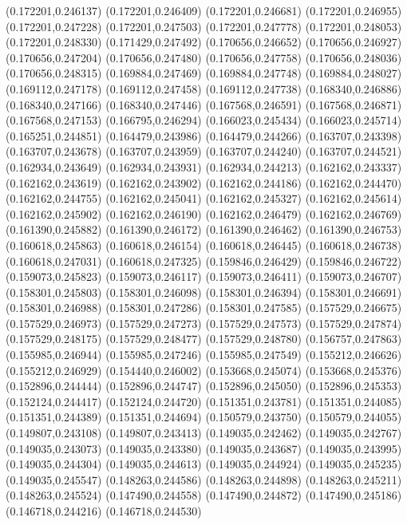 (0.172201,0.246137)
(0.172201,0.246409)
(0.172201,0.246681)
(0.172201,0.246955)
(0.172201,0.247228)
(0.172201,0.247503)
(0.172201,0.247778)
(0.172201,0.248053)
(0.172201,0.248330)
(0.171429,0.247492)
(0.170656,0.246652)
(0.170656,0.246927)
(0.170656,0.247204)
(0.170656,0.247480)
(0.170656,0.247758)
(0.170656,0.248036)
(0.170656,0.248315)
(0.169884,0.247469)
(0.169884,0.247748)
(0.169884,0.248027)
(0.169112,0.247178)
(0.169112,0.247458)
(0.169112,0.247738)
(0.168340,0.246886)
(0.168340,0.247166)
(0.168340,0.247446)
(0.167568,0.246591)
(0.167568,0.246871)
(0.167568,0.247153)
(0.166795,0.246294)
(0.166023,0.245434)
(0.166023,0.245714)
(0.165251,0.244851)
(0.164479,0.243986)
(0.164479,0.244266)
(0.163707,0.243398)
(0.163707,0.243678)
(0.163707,0.243959)
(0.163707,0.244240)
(0.163707,0.244521)
(0.162934,0.243649)
(0.162934,0.243931)
(0.162934,0.244213)
(0.162162,0.243337)
(0.162162,0.243619)
(0.162162,0.243902)
(0.162162,0.244186)
(0.162162,0.244470)
(0.162162,0.244755)
(0.162162,0.245041)
(0.162162,0.245327)
(0.162162,0.245614)
(0.162162,0.245902)
(0.162162,0.246190)
(0.162162,0.246479)
(0.162162,0.246769)
(0.161390,0.245882)
(0.161390,0.246172)
(0.161390,0.246462)
(0.161390,0.246753)
(0.160618,0.245863)
(0.160618,0.246154)
(0.160618,0.246445)
(0.160618,0.246738)
(0.160618,0.247031)
(0.160618,0.247325)
(0.159846,0.246429)
(0.159846,0.246722)
(0.159073,0.245823)
(0.159073,0.246117)
(0.159073,0.246411)
(0.159073,0.246707)
(0.158301,0.245803)
(0.158301,0.246098)
(0.158301,0.246394)
(0.158301,0.246691)
(0.158301,0.246988)
(0.158301,0.247286)
(0.158301,0.247585)
(0.157529,0.246675)
(0.157529,0.246973)
(0.157529,0.247273)
(0.157529,0.247573)
(0.157529,0.247874)
(0.157529,0.248175)
(0.157529,0.248477)
(0.157529,0.248780)
(0.156757,0.247863)
(0.155985,0.246944)
(0.155985,0.247246)
(0.155985,0.247549)
(0.155212,0.246626)
(0.155212,0.246929)
(0.154440,0.246002)
(0.153668,0.245074)
(0.153668,0.245376)
(0.152896,0.244444)
(0.152896,0.244747)
(0.152896,0.245050)
(0.152896,0.245353)
(0.152124,0.244417)
(0.152124,0.244720)
(0.151351,0.243781)
(0.151351,0.244085)
(0.151351,0.244389)
(0.151351,0.244694)
(0.150579,0.243750)
(0.150579,0.244055)
(0.149807,0.243108)
(0.149807,0.243413)
(0.149035,0.242462)
(0.149035,0.242767)
(0.149035,0.243073)
(0.149035,0.243380)
(0.149035,0.243687)
(0.149035,0.243995)
(0.149035,0.244304)
(0.149035,0.244613)
(0.149035,0.244924)
(0.149035,0.245235)
(0.149035,0.245547)
(0.148263,0.244586)
(0.148263,0.244898)
(0.148263,0.245211)
(0.148263,0.245524)
(0.147490,0.244558)
(0.147490,0.244872)
(0.147490,0.245186)
(0.146718,0.244216)
(0.146718,0.244530)
